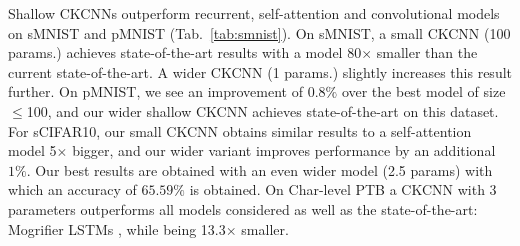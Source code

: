 \documentclass{article}
\begin{document}
Shallow CKCNNs outperform recurrent, self-attention and convolutional models on sMNIST and pMNIST (Tab.~\ref{tab:smnist}). On sMNIST, a small CKCNN (100{} params.) achieves state-of-the-art results with a model 80$\times$ smaller than the current state-of-the-art. A wider CKCNN (1{} params.) slightly increases this result further. On pMNIST, we see an improvement of $0.8\%$ over the best model of size $\leq$100{}, and our wider shallow CKCNN achieves state-of-the-art on this dataset. For sCIFAR10, our small CKCNN obtains similar results to a self-attention model 5$\times$ bigger, and our wider variant improves performance by an additional $1\%$. Our best results are obtained with an even wider model (2.5{} params) with which an accuracy of $65.59\%$ is obtained. On Char-level PTB a CKCNN with 3{} parameters outperforms all models considered as well as the state-of-the-art: Mogrifier LSTMs \citep{melis2019mogrifier}, while being 13.3$\times$ smaller.
\begin{table}
\caption{Test results on discrete sequential datasets.}
\label{tab:smnist}
\vskip -4mm
\begin{small}
\end{small}
\vspace{-3mm}
\end{table}
\end{document}
